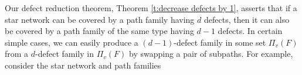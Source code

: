 \documentclass[12pt]{amsart}
\theoremstyle{definition}
\numberwithin{equation}{section}
\begin{document}
Our defect reduction theorem, Theorem \ref{t:decrease defects by 1},
asserts that if a star network can be covered by a path family having $d$ defects, then it can also be covered by a path family of the same type having $d-1$ defects. In certain simple cases, we can easily produce a $(d-1)$-defect family in some set $\Pi_v(F)$ from a $d$-defect family in $\Pi_v(F)$ by swapping a pair of subpaths.
For example, consider the 
star network and path families
\end{document}
